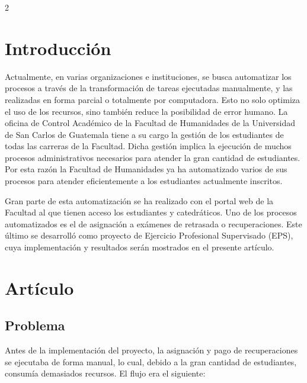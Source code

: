 \documentclass[11pt,spanish,Letterpaper,openany]{book}
\begin{document}
\begin {multicols}{2}

\hypertarget{introduccion-4}{%
\section{Introducción}\label{introduccion-4}}

Actualmente, en varias organizaciones e instituciones, se busca automatizar los procesos a través de la transformación de tareas ejecutadas manualmente, y las realizadas en forma parcial o totalmente por computadora. Esto no solo optimiza el uso de los recursos, sino también reduce la posibilidad de error humano. La oficina de Control Académico de la Facultad de Humanidades de la Universidad de San Carlos de Guatemala tiene a su cargo la gestión de los estudiantes de todas las carreras de la Facultad. Dicha gestión implica la ejecución de muchos procesos administrativos necesarios para atender la gran cantidad de estudiantes. Por esta razón la Facultad de Humanidades ya ha automatizado varios de sus procesos para atender eficientemente a los estudiantes actualmente inscritos.

Gran parte de esta automatización se ha realizado con el portal web de la Facultad al que tienen acceso los estudiantes y catedráticos. Uno de los procesos automatizados es el de asignación a exámenes de retrasada o recuperaciones. Este último se desarrolló como proyecto de Ejercicio Profesional Supervisado (EPS), cuya implementación y resultados serán mostrados en el presente artículo.

\hypertarget{articulo-3}{%
\section{Artículo}\label{articulo-3}}

\hypertarget{problema}{%
\subsection{Problema}\label{problema}}

Antes de la implementación del proyecto, la asignación y pago de recuperaciones se ejecutaba de forma manual, lo cual, debido a la gran cantidad de estudiantes, consumía demasiados recursos. El flujo era el siguiente:


\end{multicols}
\end{document}
